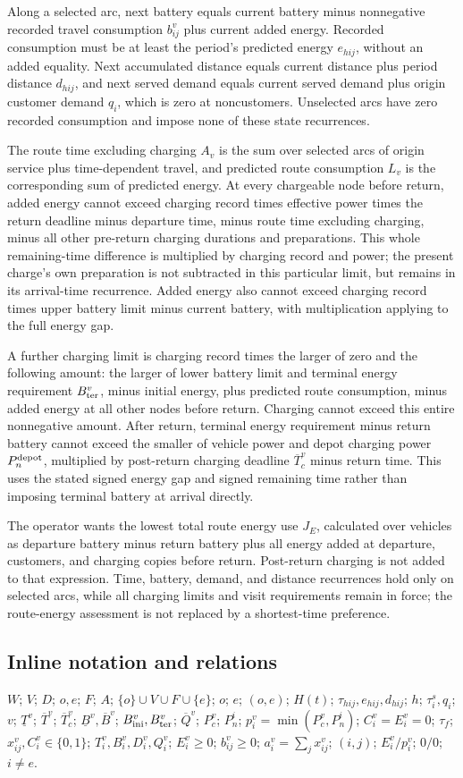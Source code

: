 \documentclass[10pt]{article}
\begin{document}
Along a selected arc, next battery equals current battery minus nonnegative recorded travel consumption $b_{ij}^v$ plus current added energy. Recorded consumption must be at least the period's predicted energy $e_{hij}$, without an added equality. Next accumulated distance equals current distance plus period distance $d_{hij}$, and next served demand equals current served demand plus origin customer demand $q_i$, which is zero at noncustomers. Unselected arcs have zero recorded consumption and impose none of these state recurrences.

The route time excluding charging $A_v$ is the sum over selected arcs of origin service plus time-dependent travel, and predicted route consumption $L_v$ is the corresponding sum of predicted energy. At every chargeable node before return, added energy cannot exceed charging record times effective power times the return deadline minus departure time, minus route time excluding charging, minus all other pre-return charging durations and preparations. This whole remaining-time difference is multiplied by charging record and power; the present charge's own preparation is not subtracted in this particular limit, but remains in its arrival-time recurrence. Added energy also cannot exceed charging record times upper battery limit minus current battery, with multiplication applying to the full energy gap.

A further charging limit is charging record times the larger of zero and the following amount: the larger of lower battery limit and terminal energy requirement $B_{\rm ter}^v$, minus initial energy, plus predicted route consumption, minus added energy at all other nodes before return. Charging cannot exceed this entire nonnegative amount. After return, terminal energy requirement minus return battery cannot exceed the smaller of vehicle power and depot charging power $P_n^{\rm depot}$, multiplied by post-return charging deadline $\overline T_c^v$ minus return time. This uses the stated signed energy gap and signed remaining time rather than imposing terminal battery at arrival directly.

The operator wants the lowest total route energy use $J_E$, calculated over vehicles as departure battery minus return battery plus all energy added at departure, customers, and charging copies before return. Post-return charging is not added to that expression. Time, battery, demand, and distance recurrences hold only on selected arcs, while all charging limits and visit requirements remain in force; the route-energy assessment is not replaced by a shortest-time preference.

\subsection*{Inline notation and relations}
$W$; $V$; $D$; $o,e$; $F$; $A$; $\{o\}\cup V\cup F\cup\{e\}$; $o$; $e$; $(o,e)$; $H(t)$; $\tau_{hij},e_{hij},d_{hij}$; $h$; $\tau_i^s,q_i$; $v$; $\underline T^v$; $\overline T^v$; $\overline T_c^v$; $\underline B^v,\overline B^v$; $B_{\rm ini}^v,B_{\rm ter}^v$; $\overline Q^v$; $P_c^v$; $P_n^i$; $p_i^v=\min(P_c^v,P_n^i)$; $C_i^v=E_i^v=0$; $\tau_f$; $x_{ij}^v,C_i^v\in\{0,1\}$; $T_i^v,B_i^v,D_i^v,Q_i^v$; $E_i^v\ge0$; $b_{ij}^v\ge0$; $a_i^v=\sum_jx_{ij}^v$; $(i,j)$; $E_i^v/p_i^v$; $0/0$; $i\ne e$.
\end{document}
